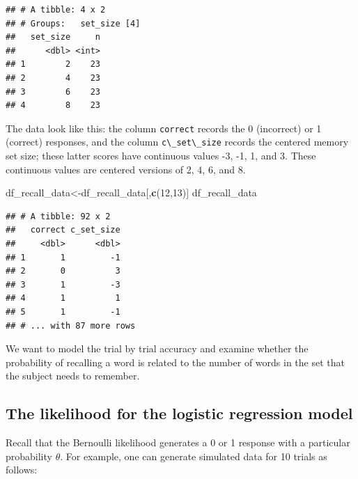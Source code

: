 \documentclass[12pt,]{krantz}
\newenvironment{Shaded}{\begin{snugshade}}{\end{snugshade}}
\newcommand{\CommentTok}[1]{\textcolor[rgb]{0.56,0.35,0.01}{\textit{#1}}}
\newcommand{\DecValTok}[1]{\textcolor[rgb]{0.00,0.00,0.81}{#1}}
\newcommand{\KeywordTok}[1]{\textcolor[rgb]{0.13,0.29,0.53}{\textbf{#1}}}
\newcommand{\NormalTok}[1]{#1}
\newcommand{\OperatorTok}[1]{\textcolor[rgb]{0.81,0.36,0.00}{\textbf{#1}}}
\newcommand{\StringTok}[1]{\textcolor[rgb]{0.31,0.60,0.02}{#1}}
\theoremstyle{definition}
\theoremstyle{definition}
\theoremstyle{definition}
\theoremstyle{remark}
\begin{document}
\begin{Shaded}
\end{Shaded}

\begin{verbatim}
## # A tibble: 4 x 2
## # Groups:   set_size [4]
##   set_size     n
##      <dbl> <int>
## 1        2    23
## 2        4    23
## 3        6    23
## 4        8    23
\end{verbatim}

The data look like this: the column \texttt{correct} records the 0 (incorrect) or 1 (correct) responses, and the column \texttt{c\textbackslash{}\_set\textbackslash{}\_size} records the centered memory set size; these latter scores have continuous values -3, -1, 1, and 3. These continuous values are centered versions of 2, 4, 6, and 8.

\begin{Shaded}
\begin{Highlighting}[]
\NormalTok{df_recall_data<-df_recall_data[,}\KeywordTok{c}\NormalTok{(}\DecValTok{12}\NormalTok{,}\DecValTok{13}\NormalTok{)]}
\NormalTok{df_recall_data}
\end{Highlighting}
\end{Shaded}

\begin{verbatim}
## # A tibble: 92 x 2
##   correct c_set_size
##     <dbl>      <dbl>
## 1       1         -1
## 2       0          3
## 3       1         -3
## 4       1          1
## 5       1         -1
## # ... with 87 more rows
\end{verbatim}

We want to model the trial by trial accuracy and examine whether the probability of recalling a word is related to the number of words in the set that the subject needs to remember.

\hypertarget{the-likelihood-for-the-logistic-regression-model}{%
\subsection{The likelihood for the logistic regression model}\label{the-likelihood-for-the-logistic-regression-model}}

Recall that the Bernoulli likelihood generates a 0 or 1 response with a particular probability \(\theta\). For example, one can generate simulated data for 10 trials as follows:
\end{document}
